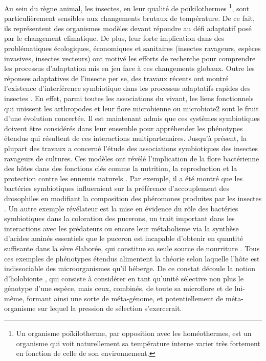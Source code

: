 Au sein du règne animal, les insectes, en leur qualité de poïkilothermes%
\footnote{Un organisme poïkilotherme, par opposition avec les homéothermes, est un organisme qui voit naturellement sa température interne varier très fortement en fonction de celle de son environnement.},
sont particulièrement sensibles aux changements brutaux de température.
De ce fait, ils représentent des organismes modèles devant répondre au défi adaptatif posé par le changement climatique.
De plus, leur forte implication dans des problématiques écologiques, économiques et sanitaires (insectes ravageurs, espèces invasives, insectes vecteurs) ont motivé les efforts de recherche pour comprendre les processus d'adaptation mis en jeu face à ces changements globaux.
Outre les réponses adaptatives de l'insecte per se, des travaux récents ont montré l'existence d'interférence symbiotique dans les processus adaptatifs rapides des insectes \cite{feldhaar2011}.
En effet, parmi toutes les associations du vivant, les liens fonctionnels qui unissent les arthropodes et leur flore microbienne ou microbiote2 sont le fruit d'une évolution concertée.
Il est maintenant admis que ces systèmes symbiotiques doivent être considérés dans leur ensemble pour appréhender les phénotypes étendus qui résultent de ces interactions multipartenaires.
Jusqu'à présent, la plupart des travaux a concerné l'étude des  associations  symbiotiques  des  insectes  ravageurs  de  cultures.
Ces  modèles  ont  révélé  l'implication  de  la  flore  bactérienne  des  hôtes  dans  des  fonctions  clés  comme  la nutrition, la reproduction et la protection contre les ennemis naturels \cite{dillondillon}.
Par exemple, il a été montré que les bactéries symbiotiques influeraient sur la préférence d'accouplement des drosophiles en modifiant la composition des phéromones produites par les insectes \cite{sharon2010}.
Un autre exemple révélateur est la mise en évidence du rôle des bactéries symbiotiques dans la coloration des pucerons, un trait important dans les interactions avec les prédateurs \cite{tsuchida2010} ou encore leur métabolisme via la synthèse d'acides aminés essentiels que le puceron est incapable d'obtenir en quantité suffisante dans la sève élaborée, qui constitue sa seule source de nourriture \cite{douglas1998}.
Tous ces exemples de phénotypes étendus alimentent la théorie selon laquelle l'hôte est indissociable des microorganismes qu'il héberge.
De ce constat découle la notion d'holobionte \cite{rosenberg2007}, qui consiste à considérer en tant qu'unité sélective non plus le génotype d'une espèce, mais ceux, combinés, de toute sa microﬂore et de lui-même, formant ainsi une sorte de méta-génome, et potentiellement de méta-organisme sur lequel la pression de sélection s'exercerait.

